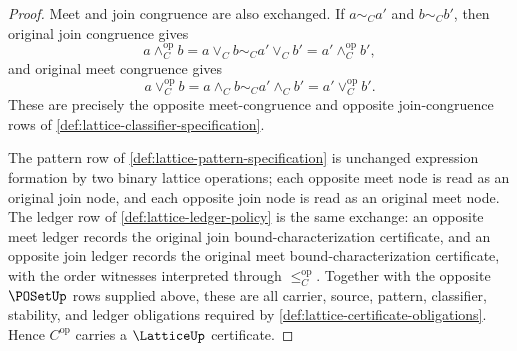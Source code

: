 \begin{proof}
Meet and join congruence are also exchanged. If $a\sim_C a'$ and $b\sim_C b'$, then original join congruence gives
$$
a\wedge_C^{\mathrm{op}} b
=
a\vee_C b
\sim_C
a'\vee_C b'
=
a'\wedge_C^{\mathrm{op}} b',
$$
and original meet congruence gives
$$
a\vee_C^{\mathrm{op}} b
=
a\wedge_C b
\sim_C
a'\wedge_C b'
=
a'\vee_C^{\mathrm{op}} b'.
$$
These are precisely the opposite meet-congruence and opposite join-congruence rows of \autoref{def:lattice-classifier-specification}.

The pattern row of \autoref{def:lattice-pattern-specification} is unchanged expression formation by two binary lattice operations; each opposite meet node is read as an original join node, and each opposite join node is read as an original meet node. The ledger row of \autoref{def:lattice-ledger-policy} is the same exchange: an opposite meet ledger records the original join bound-characterization certificate, and an opposite join ledger records the original meet bound-characterization certificate, with the order witnesses interpreted through $\le_C^{\mathrm{op}}$. Together with the opposite $\POSetUp$ rows supplied above, these are all carrier, source, pattern, classifier, stability, and ledger obligations required by \autoref{def:lattice-certificate-obligations}. Hence $C^{\mathrm{op}}$ carries a $\LatticeUp$ certificate.
\end{proof}

